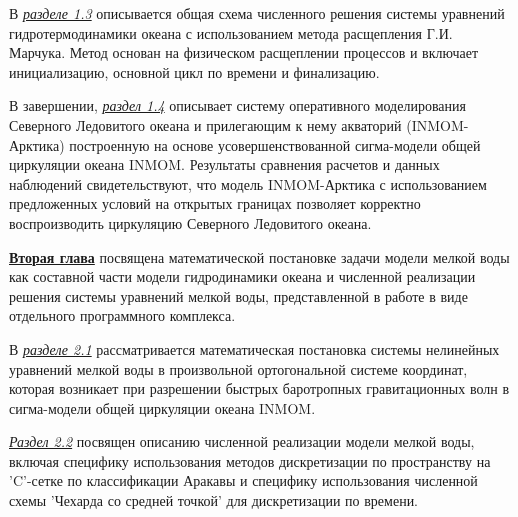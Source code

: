 В \underline{\textit{разделе 1.3}} описывается общая схема численного решения системы уравнений гидротермодинамики океана с использованием метода расщепления Г.И. Марчука. Метод основан на физическом расщеплении процессов и включает инициализацию, основной цикл по времени и финализацию.

В завершении, \underline{\textit{раздел 1.4}} описывает систему оперативного моделирования Северного Ледовитого океана и прилегающим к нему акваторий (INMOM-Арктика) построенную на основе усовершенствованной сигма-модели общей циркуляции океана INMOM.
Результаты сравнения расчетов и данных наблюдений свидетельствуют, что модель INMOM-Арктика с использованием предложенных условий на открытых границах позволяет корректно воспроизводить циркуляцию Северного Ледовитого океана.

\underline{\textbf{Вторая глава}} посвящена математической постановке задачи модели мелкой воды как составной части модели гидродинамики океана и численной реализации решения системы уравнений мелкой воды, представленной в работе в виде отдельного программного комплекса.

В \underline{\textit{разделе 2.1}} рассматривается математическая постановка системы нелинейных уравнений мелкой воды в произвольной ортогональной системе координат, которая возникает при разрешении быстрых баротропных гравитационных волн в сигма-модели общей циркуляции океана INMOM.

\underline{\textit{Раздел 2.2}} посвящен описанию численной реализации модели мелкой воды, включая специфику использования методов дискретизации по пространству на 'C'-сетке по классификации Аракавы и специфику использования численной схемы 'Чехарда со средней точкой' для дискретизации по времени.

